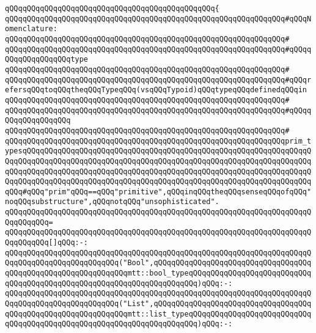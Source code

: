 \verb|qQQqqQQqqQQqqQQqqQQqqQQqqQQqqQQqqQQqqQQqqQQqqQQq{|\newline
\verb|qQQqqQQqqQQqqQQqqQQqqQQqqQQqqQQqqQQqqQQqqQQqqQQqqQQqqQQqqQQqqQQq#qQQqNomenclature:|\newline
\verb|qQQqqQQqqQQqqQQqqQQqqQQqqQQqqQQqqQQqqQQqqQQqqQQqqQQqqQQqqQQqqQQq#|\newline
\verb|qQQqqQQqqQQqqQQqqQQqqQQqqQQqqQQqqQQqqQQqqQQqqQQqqQQqqQQqqQQqqQQq#qQQqqQQqqQQqqQQqqQQqtype|\newline
\verb|qQQqqQQqqQQqqQQqqQQqqQQqqQQqqQQqqQQqqQQqqQQqqQQqqQQqqQQqqQQqqQQq#|\newline
\verb|qQQqqQQqqQQqqQQqqQQqqQQqqQQqqQQqqQQqqQQqqQQqqQQqqQQqqQQqqQQqqQQq#qQQqrefersqQQqtoqQQqtheqQQqTypeqQQq(vsqQQqTypoid)qQQqtypeqQQqdefinedqQQqin|\newline
\verb|qQQqqQQqqQQqqQQqqQQqqQQqqQQqqQQqqQQqqQQqqQQqqQQqqQQqqQQqqQQqqQQq#|\newline
\verb|qQQqqQQqqQQqqQQqqQQqqQQqqQQqqQQqqQQqqQQqqQQqqQQqqQQqqQQqqQQqqQQq#qQQqqQQqqQQqqQQqqQQq|\newline
\verb|qQQqqQQqqQQqqQQqqQQqqQQqqQQqqQQqqQQqqQQqqQQqqQQqqQQqqQQqqQQqqQQq#|\newline
\verb|qQQqqQQqqQQqqQQqqQQqqQQqqQQqqQQqqQQqqQQqqQQqqQQqqQQqqQQqqQQqqQQqprim_typesqQQqqQQqqQQqqQQqqQQqqQQqqQQqqQQqqQQqqQQqqQQqqQQqqQQqqQQqqQQqqQQqqQQqqQQqqQQqqQQqqQQqqQQqqQQqqQQqqQQqqQQqqQQqqQQqqQQqqQQqqQQqqQQqqQQqqQQqqQQqqQQqqQQqqQQqqQQqqQQqqQQqqQQqqQQqqQQqqQQqqQQqqQQqqQQqqQQqqQQqqQQqqQQqqQQqqQQqqQQqqQQqqQQqqQQqqQQqqQQqqQQqqQQqqQQqqQQqqQQqqQQqqQQqqQQqqQQqqQQq#qQQq"prim"qQQq==qQQq"primitive",qQQqinqQQqtheqQQqsenseqQQqofqQQq"noqQQqsubstructure",qQQqnotqQQq"unsophisticated".|\newline
\verb|qQQqqQQqqQQqqQQqqQQqqQQqqQQqqQQqqQQqqQQqqQQqqQQqqQQqqQQqqQQqqQQqqQQqqQQqqQQqqQQq=|\newline
\verb|qQQqqQQqqQQqqQQqqQQqqQQqqQQqqQQqqQQqqQQqqQQqqQQqqQQqqQQqqQQqqQQqqQQqqQQqqQQqqQQq[]qQQq:-:|\newline
\verb|qQQqqQQqqQQqqQQqqQQqqQQqqQQqqQQqqQQqqQQqqQQqqQQqqQQqqQQqqQQqqQQqqQQqqQQqqQQqqQQqqQQqqQQqqQQqqQQq("Bool",qQQqqQQqqQQqqQQqqQQqqQQqqQQqqQQqqQQqqQQqqQQqqQQqqQQqqQQqqQQqqQQqmtt::bool_typeqQQqqQQqqQQqqQQqqQQqqQQqqQQqqQQqqQQqqQQqqQQqqQQqqQQqqQQqqQQqqQQqqQQqqQQq)qQQq:-:|\newline
\verb|qQQqqQQqqQQqqQQqqQQqqQQqqQQqqQQqqQQqqQQqqQQqqQQqqQQqqQQqqQQqqQQqqQQqqQQqqQQqqQQqqQQqqQQqqQQqqQQq("List",qQQqqQQqqQQqqQQqqQQqqQQqqQQqqQQqqQQqqQQqqQQqqQQqqQQqqQQqqQQqqQQqmtt::list_typeqQQqqQQqqQQqqQQqqQQqqQQqqQQqqQQqqQQqqQQqqQQqqQQqqQQqqQQqqQQqqQQqqQQqqQQq)qQQq:-:|\newline
